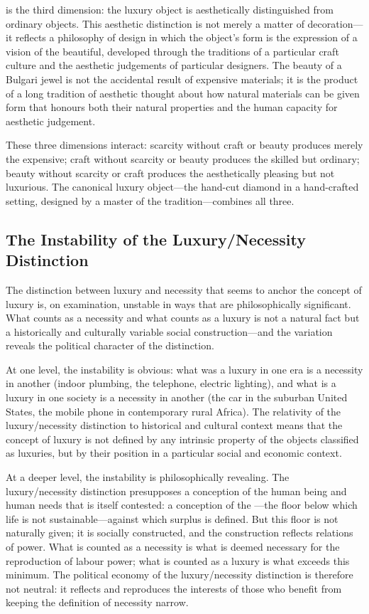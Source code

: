  is the third dimension: the luxury object is aesthetically distinguished from ordinary objects. This aesthetic distinction is not merely a matter of decoration---it reflects a philosophy of design in which the object's form is the expression of a vision of the beautiful, developed through the traditions of a particular craft culture and the aesthetic judgements of particular designers. The beauty of a Bulgari jewel is not the accidental result of expensive materials; it is the product of a long tradition of aesthetic thought about how natural materials can be given form that honours both their natural properties and the human capacity for aesthetic judgement.

These three dimensions interact: scarcity without craft or beauty produces merely the expensive; craft without scarcity or beauty produces the skilled but ordinary; beauty without scarcity or craft produces the aesthetically pleasing but not luxurious. The canonical luxury object---the hand-cut diamond in a hand-crafted setting, designed by a master of the tradition---combines all three.

\subsection{The Instability of the Luxury/Necessity Distinction}
\label{p16:subsec:instability}

\noindent
The distinction between luxury and necessity that seems to anchor the concept of luxury is, on examination, unstable in ways that are philosophically significant. What counts as a necessity and what counts as a luxury is not a natural fact but a historically and culturally variable social construction---and the variation reveals the political character of the distinction.

At one level, the instability is obvious: what was a luxury in one era is a necessity in another (indoor plumbing, the telephone, electric lighting), and what is a luxury in one society is a necessity in another (the car in the suburban United States, the mobile phone in contemporary rural Africa). The relativity of the luxury/necessity distinction to historical and cultural context means that the concept of luxury is not defined by any intrinsic property of the objects classified as luxuries, but by their position in a particular social and economic context.

At a deeper level, the instability is philosophically revealing. The luxury/necessity distinction presupposes a conception of the human being and human needs that is itself contested: a conception of the ---the floor below which life is not sustainable---against which surplus is defined. But this floor is not naturally given; it is socially constructed, and the construction reflects relations of power. What is counted as a necessity is what is deemed necessary for the reproduction of labour power; what is counted as a luxury is what exceeds this minimum. The political economy of the luxury/necessity distinction is therefore not neutral: it reflects and reproduces the interests of those who benefit from keeping the definition of necessity narrow.

